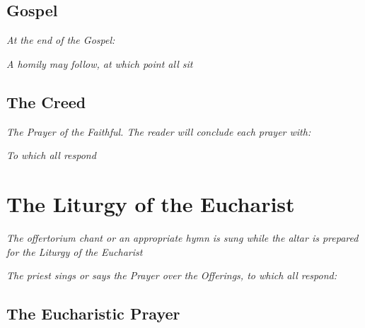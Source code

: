 \documentclass[a5paper,twoside]{article}
\begin{document}
\subsection*{Gospel}

\deacon\greeting

\all\etcumb

\deacon\lectio

\all\gloriatibi

\emph{At the end of the Gospel:}

\deacon\verbumdominib

\all\laustibi

\emph{A homily may follow, at which point all sit}

\subsection*{The Creed}

\all\credo

\emph{The Prayer of the Faithful. The reader will conclude each prayer with:}

\reader\exaudi

\emph{To which all respond}

\all\terogamus

\section*{The Liturgy of the Eucharist}

\emph{The offertorium chant or an appropriate hymn is sung while the altar is prepared for the Liturgy of the Eucharist}

\priest\benedictusa

\all\benedictusdeus

\priest\benedictusb

\all\benedictusdeus

\priest\oratefratres

\all\suscipiat

\emph{The priest sings or says the Prayer over the Offerings, to which all respond:}

\all\amen

\subsection*{The Eucharistic Prayer}

\priest\greeting

\all\etcumc

\priest\sursum
\end{document}
